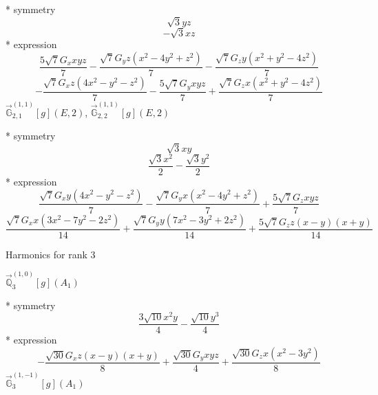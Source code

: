 \documentclass[fleqn,8pt]{jsarticle}
\begin{document}
\noindent\quad ** symmetry
\begin{dmath*}
\sqrt{3} y z
\end{dmath*}
\begin{dmath*}
- \sqrt{3} x z
\end{dmath*}
\noindent\quad ** expression
\begin{dmath*}
\frac{5 \sqrt{7} G_{x} x y z}{7} - \frac{\sqrt{7} G_{y} z \left(x^{2} - 4 y^{2} + z^{2}\right)}{7} - \frac{\sqrt{7} G_{z} y \left(x^{2} + y^{2} - 4 z^{2}\right)}{7}
\end{dmath*}
\begin{dmath*}
- \frac{\sqrt{7} G_{x} z \left(4 x^{2} - y^{2} - z^{2}\right)}{7} - \frac{5 \sqrt{7} G_{y} x y z}{7} + \frac{\sqrt{7} G_{z} x \left(x^{2} + y^{2} - 4 z^{2}\right)}{7}
\end{dmath*}
\noindent\quad $\vec{\mathbb{G}}_{2,1}^{(1,1)}[g](E,2)$, $\vec{\mathbb{G}}_{2,2}^{(1,1)}[g](E,2)$

\noindent\quad ** symmetry
\begin{dmath*}
\sqrt{3} x y
\end{dmath*}
\begin{dmath*}
\frac{\sqrt{3} x^{2}}{2} - \frac{\sqrt{3} y^{2}}{2}
\end{dmath*}
\noindent\quad ** expression
\begin{dmath*}
\frac{\sqrt{7} G_{x} y \left(4 x^{2} - y^{2} - z^{2}\right)}{7} - \frac{\sqrt{7} G_{y} x \left(x^{2} - 4 y^{2} + z^{2}\right)}{7} + \frac{5 \sqrt{7} G_{z} x y z}{7}
\end{dmath*}
\begin{dmath*}
\frac{\sqrt{7} G_{x} x \left(3 x^{2} - 7 y^{2} - 2 z^{2}\right)}{14} + \frac{\sqrt{7} G_{y} y \left(7 x^{2} - 3 y^{2} + 2 z^{2}\right)}{14} + \frac{5 \sqrt{7} G_{z} z \left(x - y\right) \left(x + y\right)}{14}
\end{dmath*}

\noindent * Harmonics for rank 3

\noindent\quad $\vec{\mathbb{Q}}_{3}^{(1,0)}[g](A_{1})$

\noindent\quad ** symmetry
\begin{dmath*}
\frac{3 \sqrt{10} x^{2} y}{4} - \frac{\sqrt{10} y^{3}}{4}
\end{dmath*}
\noindent\quad ** expression
\begin{dmath*}
- \frac{\sqrt{30} G_{x} z \left(x - y\right) \left(x + y\right)}{8} + \frac{\sqrt{30} G_{y} x y z}{4} + \frac{\sqrt{30} G_{z} x \left(x^{2} - 3 y^{2}\right)}{8}
\end{dmath*}
\noindent\quad $\vec{\mathbb{G}}_{3}^{(1,-1)}[g](A_{1})$
\end{document}
